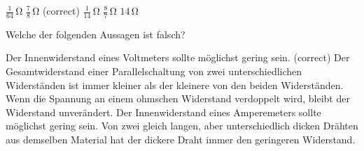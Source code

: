 \documentclass[11pt]{exam}
\begin{document}
\begin{questions}
\begin{choices}
	\choice \(\mathrm{\frac{1}{64}\,\Omega}\)
	\choice \(\mathrm{\frac{7}{8}\,\Omega}\) (correct)
	\choice \(\mathrm{\frac{1}{14}\,\Omega}\)
	\choice \(\mathrm{\frac{8}{7}\,\Omega}\)
	\choice \(\mathrm{14\,\Omega}\)
\end{choices}

\vspace{3mm}\question Welche der folgenden Aussagen ist falsch?

\begin{choices}
	\choice Der Innenwiderstand eines Voltmeters sollte möglichst gering sein. (correct)
	\choice Der Gesamtwiderstand einer Parallelschaltung von zwei unterschiedlichen Widerständen ist immer kleiner als der kleinere von den beiden Widerständen.
	\choice Wenn die Spannung an einem ohmschen Widerstand verdoppelt wird, bleibt der Widerstand unverändert.
	\choice Der Innenwiderstand eines Amperemeters sollte möglichst gering sein.
	\choice Von zwei gleich langen, aber unterschiedlich dicken Drähten aus demselben Material hat der dickere Draht immer den geringeren Widerstand.
\end{choices}

\vspace{3mm}\end{questions}
\end{document}
